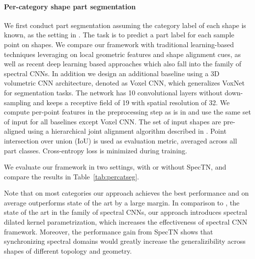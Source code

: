 \documentclass[10pt,twocolumn,letterpaper]{article}
\newcommand{\myparaly}{\vspace*{-5pt}\paragraph}
\begin{document}
\myparaly{Per-category shape part segmentation}
We first conduct part segmentation assuming the category label of each shape is known, as the setting in \cite{Yi16}. The task is to predict a part label for each sample point on shapes. We compare our framework with traditional learning-based techniques \cite{wu2014interactive,Yi16} leveraging on local geometric features and shape alignment cues, as well as recent deep learning based approaches \cite{boscaini2016learning} which also fall into the family of spectral CNNs. In addition we design an additional baseline using a 3D volumetric CNN architecture, denoted as Voxel CNN, which generalizes VoxNet~\cite{maturana2015voxnet} for segmentation tasks. The network has 10 convolutional layers without down-sampling and keeps a receptive field of 19 with spatial resolution of 32. We compute per-point features in the preprocessing step as is in \cite{Yi16} and use the same set of input for all baselines except Voxel CNN. The set of input shapes are pre-aligned using a hierarchical joint alignment algorithm described in \cite{shapenet2015}. Point intersection over union (IoU) is used as evaluation metric, averaged across all part classes. Cross-entropy loss is minimized during training. 

We evaluate our framework in two settings, with or without SpecTN, and compare the results in Table~\ref{tab:percatseg}. 

Note that on most categories our approach achieves the best performance and on average outperforms state of the art by a large margin. In comparison to \cite{boscaini2016learning},  the state of the art in the family of spectral CNNs, our approach introduces spectral dilated kernel parametrization, which increases the effectiveness of spectral CNN framework.  Moreover, the performance gain from SpecTN shows that synchronizing spectral domains would greatly increase the generalizibility across shapes of different topology and geometry. 
\end{document}

